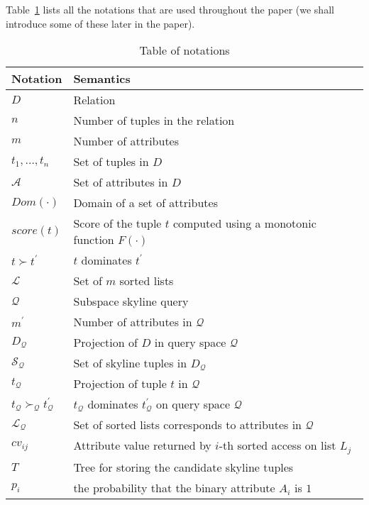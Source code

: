 Table~\ref{tab:notations} lists all the notations that are used throughout the paper (we shall introduce some of these later in the paper).
\begin{table}[!t]
\begin{tiny}
\centering
\caption{Table of notations}\label{tab:notations}
\begin{tabular}{|l|p{6cm}|}
    \hline 
    {\bf Notation} & {\bf Semantics}\\
    \hline
    $D$ & Relation\\
    \hline
    $n$ & Number of tuples in the relation\\
    \hline
    $m$ & Number of attributes\\
    \hline
    $t_1, \ldots, t_n$ & Set of tuples in $D$\\
    \hline
    $\mathcal{A}$ & Set of attributes in $D$\\
    \hline
    $Dom(\cdot)$ & Domain of a set of attributes\\
    \hline
    $score(t)$ & Score of the tuple $t$ computed using a monotonic function $F(\cdot)$\\
    \hline
    $t \succ t^\prime$ & $t$ dominates $t^\prime$\\
    \hline
    $\mathcal{L}$ & Set of $m$ sorted lists\\
    \hline
    $\mathcal{Q}$ & Subspace skyline query\\
    \hline
    $m^\prime$ & Number of attributes in $\mathcal{Q}$\\
    \hline
    $D_{\mathcal{Q}}$ & Projection of $D$ in query space $\mathcal{Q}$\\
    \hline
    $\mathcal{S}_\mathcal{Q}$ & Set of skyline tuples in $D_{\mathcal{Q}}$\\
    \hline
    $t_{\mathcal{Q}}$ & Projection of tuple $t$ in $\mathcal{Q}$\\
    \hline
    $t_{\mathcal{Q}} \succ_{\mathcal{Q}} t^\prime_{\mathcal{Q}}$ & $t_{\mathcal{Q}}$ dominates $t^\prime_{\mathcal{Q}}$ on query space $\mathcal{Q}$ \\
    \hline
    $\mathcal{L_Q}$ & Set of sorted lists corresponds to attributes in $\mathcal{Q}$\\
    \hline
    $cv_{ij}$ & Attribute value returned by $i$-th sorted access on list $L_j$\\
    \hline
    $T$ & Tree for storing the candidate skyline tuples\\
    \hline
    $p_i$ & the probability that the binary attribute $A_i$ is $1$\\
    \hline
\end{tabular}
\end{tiny}
\end{table}
